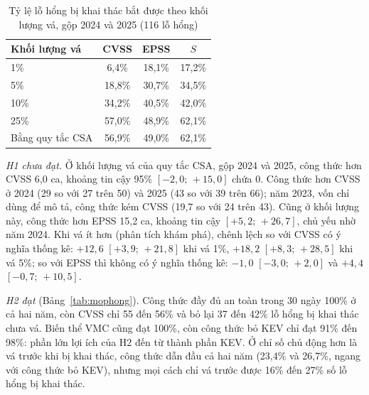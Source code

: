 \documentclass[conference]{IEEEtran}
\begin{document}
\begin{table}[htbp]
\caption{Tỷ lệ lỗ hổng bị khai thác bắt được theo khối lượng vá, gộp 2024 và 2025 (116 lỗ hổng)}\label{tab:a1}
\centering
\begin{tabular}{lccc}
\toprule
Khối lượng vá & CVSS & EPSS & $S$ \\
\midrule
1\%  & 6,4\%  & 18,1\% & 17,2\% \\
5\%  & 18,8\% & 30,7\% & 34,5\% \\
10\% & 34,2\% & 40,5\% & 42,0\% \\
25\% & 57,0\% & 48,9\% & 62,1\% \\
Bằng quy tắc CSA & 56,9\% & 49,0\% & 62,1\% \\
\bottomrule
\end{tabular}
\end{table}

\emph{H1 chưa đạt.} Ở khối lượng vá của quy tắc CSA, gộp 2024 và 2025, công thức hơn CVSS 6,0 ca,
khoảng tin cậy 95\% $[-2{,}0;\,+15{,}0]$ chứa 0. Công thức hơn CVSS ở 2024 (29 so với 27 trên 50) và
2025 (43 so với 39 trên 66); năm 2023, vốn chỉ dùng để mô tả, công thức kém CVSS (19,7 so với 24
trên 43). Cũng ở khối lượng này, công thức hơn EPSS 15,2 ca, khoảng tin cậy $[+5{,}2;\,+26{,}7]$,
chủ yếu nhờ năm 2024. Khi vá ít hơn (phân tích khám phá), chênh lệch so với CVSS có ý nghĩa thống kê:
$+12{,}6$ $[+3{,}9;\,+21{,}8]$ khi vá 1\%, $+18{,}2$ $[+8{,}3;\,+28{,}5]$ khi vá 5\%; so với EPSS thì không có ý nghĩa thống kê: $-1{,}0$ $[-3{,}0;\,+2{,}0]$ và $+4{,}4$ $[-0{,}7;\,+10{,}5]$.

\emph{H2 đạt} (Bảng~\ref{tab:mophong}). Công thức đầy đủ an toàn trong 30 ngày 100\% ở cả hai năm,
còn CVSS chỉ 55 đến 56\% và bỏ lại 37 đến 42\% lỗ hổng bị khai thác chưa vá. Biến thể VMC cũng đạt 100\%,
còn công thức bỏ KEV chỉ đạt 91\% đến 98\%: phần lớn lợi ích của H2 đến từ thành phần KEV. Ở chỉ số chủ
động hơn là vá trước khi bị khai thác, công thức dẫn đầu cả hai năm (23,4\% và 26,7\%, ngang với công thức bỏ KEV), nhưng mọi
cách chỉ vá trước được 16\% đến 27\% số lỗ hổng bị khai thác.
\end{document}
